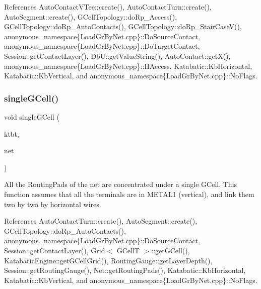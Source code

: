  

References Auto\+Contact\+V\+Tee\+::create(), Auto\+Contact\+Turn\+::create(), Auto\+Segment\+::create(), G\+Cell\+Topology\+::do\+Rp\+\_\+\+Access(), G\+Cell\+Topology\+::do\+Rp\+\_\+\+Auto\+Contacts(), G\+Cell\+Topology\+::do\+Rp\+\_\+\+Stair\+Case\+V(), anonymous\+\_\+namespace\{\+Load\+Gr\+By\+Net.\+cpp\}\+::\+Do\+Source\+Contact, anonymous\+\_\+namespace\{\+Load\+Gr\+By\+Net.\+cpp\}\+::\+Do\+Target\+Contact, Session\+::get\+Contact\+Layer(), Db\+U\+::get\+Value\+String(), Auto\+Contact\+::get\+X(), anonymous\+\_\+namespace\{\+Load\+Gr\+By\+Net.\+cpp\}\+::\+H\+Access, Katabatic\+::\+Kb\+Horizontal, Katabatic\+::\+Kb\+Vertical, and anonymous\+\_\+namespace\{\+Load\+Gr\+By\+Net.\+cpp\}\+::\+No\+Flags.

\mbox{\label{group__LoadGlobalRouting_ga3973291866b39c10cea5ca17f7d174fb}} 
\subsubsection{\texorpdfstring{single\+G\+Cell()}{singleGCell()}}
{\footnotesize\ttfamily void single\+G\+Cell (\begin{DoxyParamCaption}\item[{\mbox{\hyperlink{classKatabatic_1_1KatabaticEngine}{Katabatic\+Engine}} $\ast$}]{ktbt,  }\item[{\textbf{ Net} $\ast$}]{net }\end{DoxyParamCaption})}

All the Routing\+Pads of the net are concentrated under a single G\+Cell. This function assumes that all the terminals are in {\ttfamily M\+E\+T\+A\+L1} (vertical), and link them two by two by horizontal wires. 

References Auto\+Contact\+Turn\+::create(), Auto\+Segment\+::create(), G\+Cell\+Topology\+::do\+Rp\+\_\+\+Auto\+Contacts(), anonymous\+\_\+namespace\{\+Load\+Gr\+By\+Net.\+cpp\}\+::\+Do\+Source\+Contact, Session\+::get\+Contact\+Layer(), Grid$<$ G\+Cell\+T $>$\+::get\+G\+Cell(), Katabatic\+Engine\+::get\+G\+Cell\+Grid(), Routing\+Gauge\+::get\+Layer\+Depth(), Session\+::get\+Routing\+Gauge(), Net\+::get\+Routing\+Pads(), Katabatic\+::\+Kb\+Horizontal, Katabatic\+::\+Kb\+Vertical, and anonymous\+\_\+namespace\{\+Load\+Gr\+By\+Net.\+cpp\}\+::\+No\+Flags.

